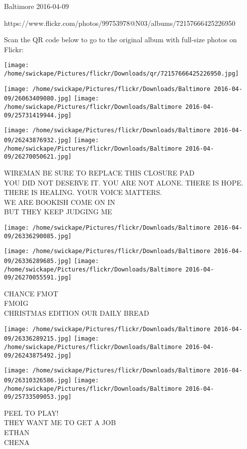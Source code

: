 \documentclass[10pt,letterpaper]{article}
\begin{document}
Baltimore 2016-04-09

https://www.flickr.com/photos/99753978@N03/albums/72157666425226950

Scan the QR code below to go to the original album with full-size photos on Flickr:

\texttt{[image: /home/swickape/Pictures/flickr/Downloads/qr/72157666425226950.jpg]}
\pagebreak

\texttt{[image: /home/swickape/Pictures/flickr/Downloads/Baltimore 2016-04-09/26063409080.jpg]}
\texttt{[image: /home/swickape/Pictures/flickr/Downloads/Baltimore 2016-04-09/25731419944.jpg]}

\texttt{[image: /home/swickape/Pictures/flickr/Downloads/Baltimore 2016-04-09/26243876932.jpg]}
\texttt{[image: /home/swickape/Pictures/flickr/Downloads/Baltimore 2016-04-09/26270050621.jpg]}

WIREMAN BE SURE TO REPLACE THIS CLOSURE PAD\\
YOU DID NOT DESERVE IT. YOU ARE NOT ALONE. THERE IS HOPE. THERE IS HEALING. YOUR VOICE MATTERS.\\
WE ARE BOOKISH COME ON IN\\
BUT THEY KEEP JUDGING ME
\pagebreak

\texttt{[image: /home/swickape/Pictures/flickr/Downloads/Baltimore 2016-04-09/26336290085.jpg]}

\vspace{0.25in}
\texttt{[image: /home/swickape/Pictures/flickr/Downloads/Baltimore 2016-04-09/26336289685.jpg]}
\texttt{[image: /home/swickape/Pictures/flickr/Downloads/Baltimore 2016-04-09/26270055591.jpg]}

CHANCE FMOT\\
FMOIG\\
CHRISTMAS EDITION OUR DAILY BREAD
\pagebreak

\texttt{[image: /home/swickape/Pictures/flickr/Downloads/Baltimore 2016-04-09/26336289215.jpg]}
\texttt{[image: /home/swickape/Pictures/flickr/Downloads/Baltimore 2016-04-09/26243875492.jpg]}

\texttt{[image: /home/swickape/Pictures/flickr/Downloads/Baltimore 2016-04-09/26310326586.jpg]}
\texttt{[image: /home/swickape/Pictures/flickr/Downloads/Baltimore 2016-04-09/25733509053.jpg]}

PEEL TO PLAY!\\
THEY WANT ME TO GET A JOB\\
ETHAN\\
CHENA
\pagebreak
\end{document}
